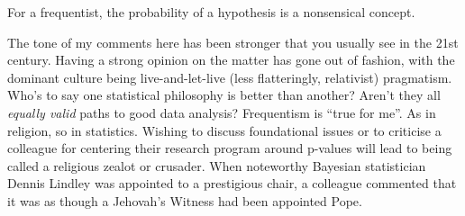 \documentclass[a4paper, 12pt]{article}
\begin{document}
For a frequentist, the probability of a hypothesis is a nonsensical concept.



The tone of my comments here has been stronger that you usually see in the
21st century. Having a strong opinion on the matter has gone out of fashion,
with the dominant culture being live-and-let-live (less flatteringly,
relativist) pragmatism. Who's to say one statistical philosophy is better than
another? Aren't they all {\it equally valid} paths to good data analysis?
Frequentism is ``true for me''. As in religion, so in statistics.
Wishing to discuss foundational issues or to criticise
a colleague for centering their research program around p-values will lead to
being called a religious zealot or crusader. When noteworthy Bayesian statistician
Dennis Lindley was appointed to a prestigious chair, a colleague commented that
it was as though a Jehovah's Witness had been appointed Pope.



\end{document}
